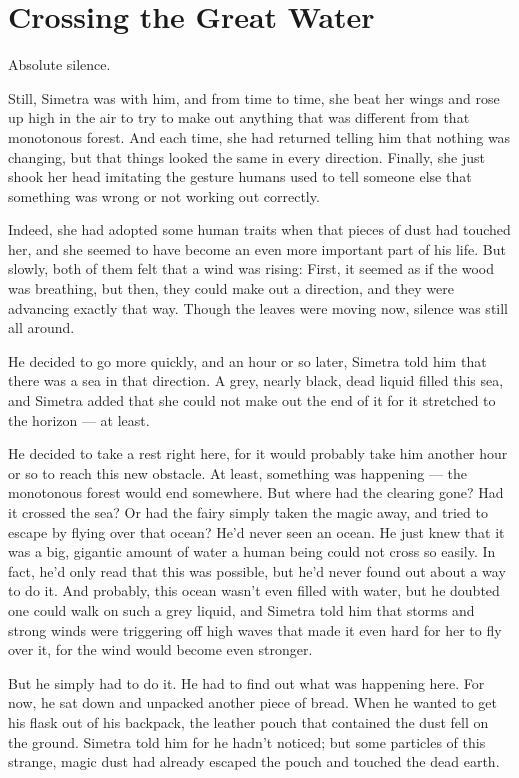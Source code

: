 \chapter{Crossing the Great Water}
\label{cha:crossing-great-water}
Absolute silence.

Still, Simetra was with him, and from time to time, she beat her wings and rose up high in the air to try to make out anything that was different from that monotonous forest. And each time, she had returned telling him that nothing was changing, but that things looked the same in every direction. Finally, she just shook her head imitating the gesture humans used to tell someone else that something was wrong or not working out correctly.

Indeed, she had adopted some human traits when that pieces of dust had touched her, and she seemed to have become an even more important part of his life. 
But slowly, both of them felt that a wind was rising: First, it seemed as if the wood was breathing, but then, they could make out a direction, and they were advancing exactly that way. Though the leaves were moving now, silence was still all around.

He decided to go more quickly, and an hour or so later, Simetra told him that there was a sea in that direction. A grey, nearly black, dead liquid filled this sea, and Simetra added that she could not make out the end of it for it stretched to the horizon --- at least.

He decided to take a rest right here, for it would probably take him another hour or so to reach this new obstacle. At least, something was happening --- the monotonous forest would end somewhere. 
But where had the clearing gone? 
Had it crossed the sea? Or had the fairy simply taken the magic away, and tried to escape by flying over that ocean? 
He'd never seen an ocean. He just knew that it was a big, gigantic amount of water a human being could not cross so easily. In fact, he'd only read that this was possible, but he'd never found out about a way to do it. 
And probably, this ocean wasn't even filled with water, but he doubted one could walk on such a grey liquid, and Simetra told him that storms and strong winds were triggering off high waves that made it even hard for her to fly over it, for the wind would become even stronger.

But he simply had to do it. 
He had to find out what was happening here. 
For now, he sat down and unpacked another piece of bread. 
When he wanted to get his flask out of his backpack, the leather pouch that contained the dust fell on the ground. Simetra told him for he hadn't noticed; but some particles of this strange, magic dust had already escaped the pouch and touched the dead earth.


